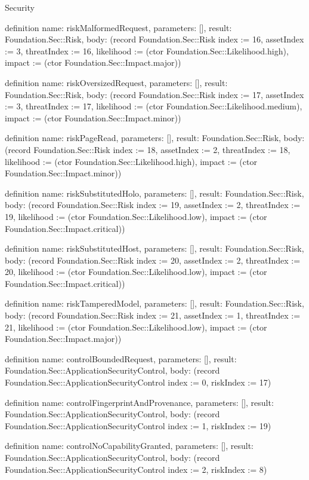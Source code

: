 \begin{lexlean}{Security}
\begin{semanticmodule}
definition{
  name: riskMalformedRequest,
  parameters: [],
  result: Foundation.Sec::Risk,
  body: (record Foundation.Sec::Risk {index := 16, assetIndex := 3, threatIndex := 16, likelihood := (ctor Foundation.Sec::Likelihood.high), impact := (ctor Foundation.Sec::Impact.major)})
}

definition{
  name: riskOversizedRequest,
  parameters: [],
  result: Foundation.Sec::Risk,
  body: (record Foundation.Sec::Risk {index := 17, assetIndex := 3, threatIndex := 17, likelihood := (ctor Foundation.Sec::Likelihood.medium), impact := (ctor Foundation.Sec::Impact.minor)})
}

definition{
  name: riskPageRead,
  parameters: [],
  result: Foundation.Sec::Risk,
  body: (record Foundation.Sec::Risk {index := 18, assetIndex := 2, threatIndex := 18, likelihood := (ctor Foundation.Sec::Likelihood.high), impact := (ctor Foundation.Sec::Impact.minor)})
}

definition{
  name: riskSubstitutedHolo,
  parameters: [],
  result: Foundation.Sec::Risk,
  body: (record Foundation.Sec::Risk {index := 19, assetIndex := 2, threatIndex := 19, likelihood := (ctor Foundation.Sec::Likelihood.low), impact := (ctor Foundation.Sec::Impact.critical)})
}

definition{
  name: riskSubstitutedHost,
  parameters: [],
  result: Foundation.Sec::Risk,
  body: (record Foundation.Sec::Risk {index := 20, assetIndex := 2, threatIndex := 20, likelihood := (ctor Foundation.Sec::Likelihood.low), impact := (ctor Foundation.Sec::Impact.critical)})
}

definition{
  name: riskTamperedModel,
  parameters: [],
  result: Foundation.Sec::Risk,
  body: (record Foundation.Sec::Risk {index := 21, assetIndex := 1, threatIndex := 21, likelihood := (ctor Foundation.Sec::Likelihood.low), impact := (ctor Foundation.Sec::Impact.major)})
}

definition{
  name: controlBoundedRequest,
  parameters: [],
  result: Foundation.Sec::ApplicationSecurityControl,
  body: (record Foundation.Sec::ApplicationSecurityControl {index := 0, riskIndex := 17})
}

definition{
  name: controlFingerprintAndProvenance,
  parameters: [],
  result: Foundation.Sec::ApplicationSecurityControl,
  body: (record Foundation.Sec::ApplicationSecurityControl {index := 1, riskIndex := 19})
}

definition{
  name: controlNoCapabilityGranted,
  parameters: [],
  result: Foundation.Sec::ApplicationSecurityControl,
  body: (record Foundation.Sec::ApplicationSecurityControl {index := 2, riskIndex := 8})
}


\end{semanticmodule}
\end{lexlean}
